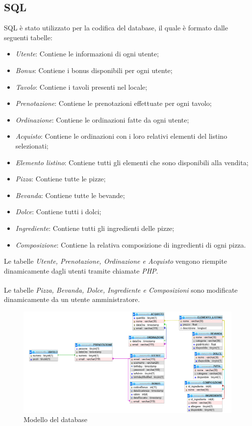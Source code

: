 \subsection{SQL}
SQL è stato utilizzato per la codifica del database, il quale è formato dalle seguenti tabelle:
\begin{itemize}
	\item \textit{Utente}: Contiene le informazioni di ogni utente;
	\item \textit{Bonus}: Contiene i bonus disponibili per ogni utente;
	\item \textit{Tavolo}: Contiene i tavoli presenti nel locale;
	\item \textit{Prenotazione}: Contiene le prenotazioni effettuate per ogni tavolo;
	\item \textit{Ordinazione}: Contiene le ordinazioni fatte da ogni utente;
	\item \textit{Acquisto}: Contiene le ordinazioni con i loro relativi elementi del listino selezionati;
	\item \textit{Elemento listino}: Contiene tutti gli elementi che sono disponibili alla vendita;
	\item \textit{Pizza}: Contiene tutte le pizze;
	\item \textit{Bevanda}: Contiene tutte le bevande;
	\item \textit{Dolce}: Contiene tutti i dolci;
	\item \textit{Ingrediente}: Contiene tutti gli ingredienti delle pizze;
	\item \textit{Composizione}: Contiene la relativa composizione di ingredienti di ogni pizza.
\end{itemize}
Le tabelle \textit{Utente, Prenotazione, Ordinazione e Acquisto} vengono riempite dinamicamente dagli
utenti tramite chiamate \textit{PHP}.\\
\\
Le tabelle \textit{Pizza, Bevanda, Dolce, Ingrediente e Composizioni} sono modificate dinamicamente da un
utente amministratore.
\begin{figure}[H]
	\centering
	\includegraphics[scale=0.4]{resources/database_model.png}
	\caption{Modello del database}
\end{figure}

